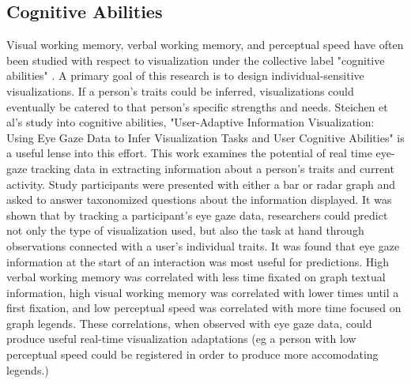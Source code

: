 \documentclass[conference]{IEEEtran}
\begin{document}
\subsection{Cognitive Abilities}
Visual working memory, verbal working memory, and perceptual speed have often
been studied with respect to visualization under the collective label
"cognitive abilities" \cite{UserAdaptive, HighlightingInterventions, ConatiLayouts}.
A primary goal of this research is to design individual-sensitive
visualizations. If a person's traits could be inferred, visualizations could
eventually be catered to that person's specific strengths and needs. Steichen
et al's study into cognitive abilities, "User-Adaptive Information Visualization:
Using Eye Gaze Data to Infer Visualization Tasks and User Cognitive Abilities"
is a useful lense into this effort\cite{UserAdaptive}. This work examines the
potential of real time eye-gaze tracking data in extracting information about
a person's traits and current activity. Study participants were presented
with either a bar or radar graph and asked to answer taxonomized questions
about the information displayed. It was shown that by tracking a participant's
eye gaze data, researchers could predict not only the type of visualization
used, but also the task at hand through observations connected with a user's
individual traits. It was found that eye gaze information at the start of an
interaction was most useful for predictions. High verbal working memory
was correlated with less time fixated on graph textual information, high
visual working memory was correlated with lower times until a first fixation,
and low perceptual speed was correlated with more time focused on graph legends.
These correlations, when observed with eye gaze data, could produce useful
real-time visualization adaptations (eg a person with low perceptual speed
could be registered in order to produce more accomodating legends.)
\end{document}
